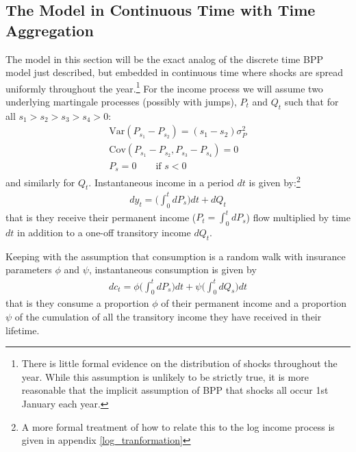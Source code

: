 \documentclass[AER]{AEA}
\begin{document}
\subsection{The Model in Continuous Time with Time Aggregation}
The model in this section will be the exact analog of the discrete time BPP model just described, but embedded in continuous time where shocks are spread uniformly throughout the year.\footnote{There is little formal evidence on the distribution of shocks throughout the year. While this assumption is unlikely to be strictly true, it is more reasonable that the implicit assumption of BPP that shocks all occur 1st January each year.} For the income process we will assume two underlying martingale processes (possibly with jumps), $P_t$ and $Q_t$ such that for all $s_1>s_2>s_3>s_4>0$:
\begin{align*}
\mathrm{Var}(P_{s_1}-P_{s_2})=(s_1-s_2)\sigma_P^2 \\
\mathrm{Cov}(P_{s_1}-P_{s_2},P_{s_3}-P_{s_4}) = 0 \\
P_s = 0 \qquad \text{if } s<0
\end{align*}
and similarly for $Q_t$.  Instantaneous income in a period $dt$ is given by:\footnote{A more formal treatment of how to relate this to the log income process is given in appendix \ref{log_tranformation}}
\begin{align}
dy_t = \Big( \int_{0}^{t}dP_s \Big) dt  +dQ_t \label{income_process}
\end{align}
that is they receive their permanent income ($P_t =\int_{0}^{t}dP_s $) flow multiplied by time $dt$ in addition to a one-off transitory income $dQ_t$.

Keeping with the assumption that consumption is a random walk with insurance parameters $\phi$ and $\psi$, instantaneous consumption is given by
\begin{align}
dc_t = \phi \Big( \int_{0}^{t} dP_s  \Big) dt +\psi\Big( \int_{0}^{t}dQ_s\Big) dt  \label{consumption_process}
\end{align}
that is they consume a proportion $\phi$ of their permanent income and a proportion $\psi$ of the cumulation of all the transitory income they have received in their lifetime.
\end{document}
